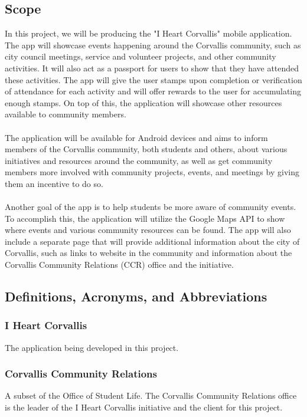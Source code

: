 \documentclass[draftclsnofoot, onecolumn, 10pt, compsoc]{IEEEtran}
\begin{document}
		\subsection{Scope}
			In this project, we will be producing the "I Heart Corvallis" mobile application. The app will showcase events happening around the Corvallis community, such as city council meetings, service and volunteer projects, and other community activities. It will also act as a passport for users to show that they have attended these activities. The app will give the user stamps upon completion or verification of attendance for each activity and will offer rewards to the user for accumulating enough stamps. On top of this, the application will showcase other resources available to community members. \\ \\
			The application will be available for Android devices and aims to inform members of the Corvallis community, both students and others, about various initiatives and resources around the community, as well as get community members more involved with community projects, events, and meetings by giving them an incentive to do so. \\ \\
			Another goal of the app is to help students be more aware of community events.  To accomplish this, the application will utilize the Google Maps API to show where events and various community resources can be found. The app will also include a separate page that will provide additional information about the city of Corvallis, such as links to website in the community and information about the Corvallis Community Relations (CCR) office and the initiative.

		\subsection{Definitions, Acronyms, and Abbreviations}
			\subsubsection{I Heart Corvallis} The application being developed in this project.
			\subsubsection{Corvallis Community Relations} A subset of the Office of Student Life. The Corvallis Community Relations office is the leader of the I Heart Corvallis initiative and the client for this project.
\end{document}
